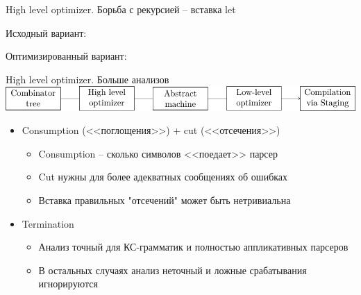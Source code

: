 
\begin{frame}{High level optimizer. Борьба с рекурсией -- вставка let}
\newln

\Large Исходный вариант:
\haskellLetZero

\newln 

Оптимизированный вариант:
\haskellLetOne
\end{frame}


\begin{frame}{High level optimizer. Больше анализов}
\includegraphics[page=3]{pipeline}
\newln 

\large 
\begin{itemize}
\item Consumption (<<поглощения>>) + cut (<<отсечения>>)
\begin{itemize}\large 
\item Consumption -- сколько символов <<поедает>> парсер
\item Cut нужны для более адекватных сообщениях об ошибках
\item Вставка правильных "отсечений" может быть нетривиальна
\end{itemize}
\newln 

\item Termination
\begin{itemize}\large 
\item Анализ точный для КС-грамматик и полностью аппликативных парсеров
\item В остальных случаях анализ неточный и ложные срабатывания игнорируются
\end{itemize}
\end{itemize}
\end{frame}




